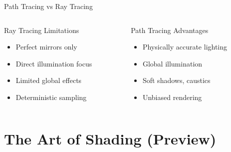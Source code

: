 \begin{frame}{Path Tracing vs Ray Tracing}
    \begin{columns}
        \begin{column}{0.5\textwidth}
            \begin{raybox}{Ray Tracing Limitations}
                \begin{itemize}
                    \item Perfect mirrors only
                    \item Direct illumination focus
                    \item Limited global effects
                    \item Deterministic sampling
                \end{itemize}
            \end{raybox}
        \end{column}
        \begin{column}{0.5\textwidth}
            \begin{raybox}{Path Tracing Advantages}
                \begin{itemize}
                    \item Physically accurate lighting
                    \item Global illumination
                    \item Soft shadows, caustics
                    \item Unbiased rendering
                \end{itemize}
            \end{raybox}
        \end{column}
    \end{columns}
\end{frame}

\section{The Art of Shading (Preview)}


